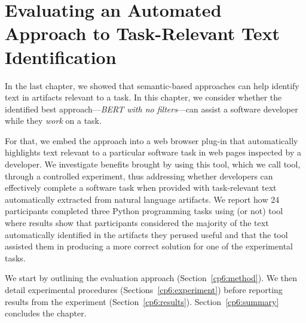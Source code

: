 \setcounter{chapter}{5}


\chapter{Evaluating an Automated Approach to Task-Relevant Text Identification}
\label{ch:assisting}


In the last chapter, we showed that semantic-based approaches can help identify text in artifacts relevant to a task. 
In this chapter, we consider whether the identified best approach---\textit{BERT with no filters}---can assist a software developer while they \textit{work} on a task.





For that, we embed the approach into a web browser plug-in that automatically highlights 
text relevant to a particular software task in web pages inspected by a developer.
We investigate benefits brought by using this tool, which we call \acs{tool}, through a controlled experiment,
thus addressing whether developers can effectively complete a software task 
when provided with task-relevant text automatically extracted from natural language artifacts. 
We report how  24 participants completed three Python programming tasks using (or not) \acs{tool}
where results show that participants considered the majority of the text automatically identified in the artifacts 
they perused useful and that 
the tool assisted them in producing a more correct solution for one of the experimental tasks.



We start by outlining the evaluation approach  (Section~\ref{cp6:method}). We then
detail experimental procedures  (Sections~\ref{cp6:experiment}) before reporting
results from the experiment 
(Section~\ref{cp6:results}).
Section~\ref{cp6:summary} concludes the chapter.
















% 

